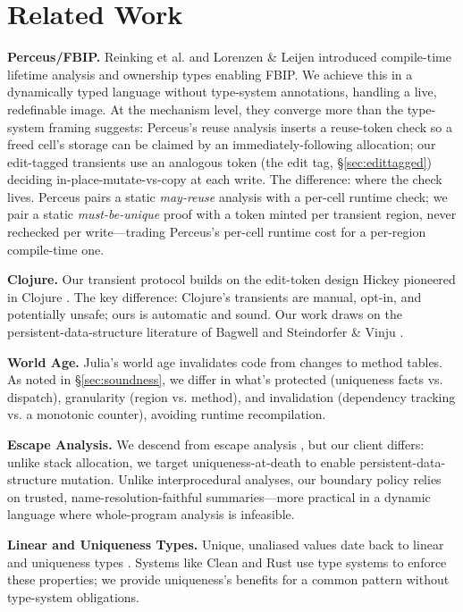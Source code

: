 \documentclass[sigplan,review,anonymous]{acmart}
\begin{document}
\section{Related Work}
\label{sec:related}
\textbf{Perceus/FBIP.} Reinking et al. \cite{reinking2021perceus} and Lorenzen \& Leijen \cite{lorenzen2023functional} introduced compile-time lifetime analysis and ownership types enabling FBIP. We achieve this in a dynamically typed language without type-system annotations, handling a live, redefinable image. At the mechanism level, they converge more than the type-system framing suggests: Perceus's reuse analysis inserts a reuse-token check so a freed cell's storage can be claimed by an immediately-following allocation; our edit-tagged transients use an analogous token (the edit tag, §\ref{sec:edittagged}) deciding in-place-mutate-vs-copy at each write. The difference: where the check lives. Perceus pairs a static \emph{may-reuse} analysis with a per-cell runtime check; we pair a static \emph{must-be-unique} proof with a token minted per transient region, never rechecked per write---trading Perceus's per-cell runtime cost for a per-region compile-time one.

\textbf{Clojure.} Our transient protocol builds on the edit-token design Hickey pioneered in Clojure \cite{hickey2009clojure}. The key difference: Clojure's transients are manual, opt-in, and potentially unsafe; ours is automatic and sound. Our work draws on the persistent-data-structure literature of Bagwell \cite{bagwell2001ideal} and Steindorfer \& Vinju \cite{steindorfer2015optimizing}.

\textbf{World Age.} Julia's world age \cite{belyakova2020jit} invalidates code from changes to method tables. As noted in §\ref{sec:soundness}, we differ in what's protected (uniqueness facts vs. dispatch), granularity (region vs. method), and invalidation (dependency tracking vs. a monotonic counter), avoiding runtime recompilation.

\textbf{Escape Analysis.} We descend from escape analysis \cite{blanchet2003escape, choi1999escape, stadler2014partial}, but our client differs: unlike stack allocation, we target uniqueness-at-death to enable persistent-data-structure mutation. Unlike interprocedural analyses, our boundary policy relies on trusted, name-resolution-faithful summaries---more practical in a dynamic language where whole-program analysis is infeasible.

\textbf{Linear and Uniqueness Types.} Unique, unaliased values date back to linear and uniqueness types \cite{wadler1990linear}. Systems like Clean and Rust use type systems to enforce these properties; we provide uniqueness's benefits for a common pattern without type-system obligations.
\end{document}
